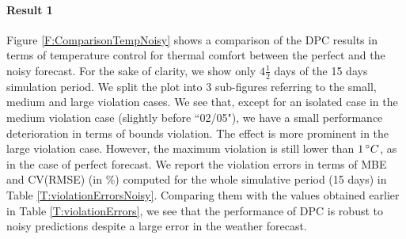 \textcolor[rgb]{0,0,1}{\paragraph{Result 1} Figure \ref{F:ComparisonTempNoisy} shows a comparison of the DPC results in terms of temperature control for thermal comfort between the perfect and the noisy forecast.
For the sake of clarity, we show only \(4\frac{1}{2}\) days of the 15 days simulation period. We split the plot into 3 sub-figures referring to the small, medium and large violation cases.
We see that, except for an isolated case in the medium violation case (slightly before ``02/05"), we have a small performance deterioration in terms of bounds violation. The effect is more prominent in the large violation case.
However, the maximum violation is still lower than $1\,\degree C$, as in the case of perfect forecast.
We report the violation errors in terms of MBE and CV(RMSE) (in $\%$) computed for the whole simulative period (15 days) in Table \ref{T:violationErrorsNoisy}.
Comparing them with the values obtained earlier in Table \ref{T:violationErrors}, we see that the performance of DPC is robust to noisy predictions despite a large error in the weather forecast.
}
